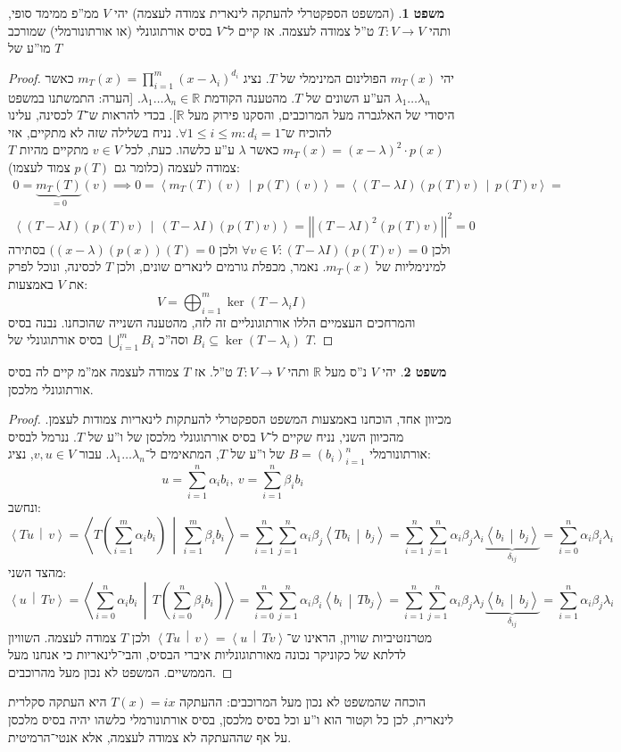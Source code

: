 \documentclass[a4paper]{article}
\newcommand\R     {\mathbb{R}}
\newcommand\ra    {\rangle}
\newcommand\la    {\langle}
\newcommand\sumni     {\sum_{i = 0}^{n}}
\newcommand\co        {\colon}
\newcommand\norm[1]   {\left \vert \left \vert #1 \right \vert \right \vert}
\newcommand\mut [2]   {\left \la #1 \,\middle\vert\, #2 \right \ra}
\newcommand\ag        {\alpha}
\newcommand\bg        {\beta}
\newcommand\dg        {\delta}
\renewcommand\lg      {\lambda}
\newcommand\cl [1]    {\left ( #1 \right )}
\theoremstyle{definition}
\newtheorem{Theorem}{משפט}
\newcommand\theo  [1] {\begin{Theorem}#1\end{Theorem}}
\begin{document}
	\theo{(המשפט הספקטרלי להעתקה לינארית צמודה לעצמה) יהי $V$ ממ''פ ממימד סופי, ותהי $T \co V \to V$ ט''ל צמודה לעצמה. אז קיים ל־$V$ בסיס אורתוגונלי (או אורתונורמלי) שמורכב מו''ע של $T$} \begin{proof}
		יהי $m_T(x)$ הפולינום המינימלי של $T$. נציג $m_T(x) = \prod_{i = 1}^{m}(x - \lg_i)^{d_i}$ כאשר $\lg_1 \dots \lg_n$ הע''ע השונים של $T$. מהטענה הקודמת $\lg_1 \dots \lg_n \in \R$. [הערה: התמשתנו במשפט היסודי של האלגברה מעל המרוכבים, והסקנו פירוק מעל $\R$]. בכדי להראות ש־$T$ לכסינה, עלינו להוכיח ש־$\forall 1 \le i \le m \co d_i = 1$. נניח בשלילה שזה לא מתקיים, אזי $m_T(x) = (x - \lg)^2 \cdot p(x)$ כאשר $\lg$ ע''ע כלשהו. כעת, לכל $v \in V$ מתקיים מהיות $T$ צמודה לעצמה (כלומר גם $p(T)$ צמוד לעצמו): 
		\begin{multline*}
			0 = \underbrace{m_T(T)}_{=0}(v) \implies 0 = \mut{m_T(T)(v)}{p(T)(v)} = \mut{(T - \lg I)(p(T)v)}{p(T)v} =\\ \mut{(T - \lg I)(p(T)v)}{(T - \lg I)(p(T)v)} = \norm{(T - \lg I)^2(p(T)v)}^2 = 0
		\end{multline*}
		ולכן $\forall v \in V \co (T - \lg I)(p(T)v) = 0$ ולכן $((x - \lg)(p(x))(T) = 0$ בסתירה למינימליות של $m_T(x)$. נאמר, מכפלת גורמים לינארים שונים, ולכן $T$ לכסינה, ונוכל לפרק את $V$ באמצעות: 
		\[ V = \bigoplus_{i = 1}^{m} \ker (T - \lg_i I) \]
		והמרחכים העצמיים הללו אורתוגונליים זה לזה, מהטענה השנייה שהוכחנו. 
		נבנה בסיס $B_i \subseteq \ker (T - \lg_i)$ וסה''כ $\bigcup_{i = 1}^{m} B_i$ בסיס אורתוגונלי של $T$. 
	\end{proof}
	\theo{יהי $V$ נ''ס מעל $\R$ ותהי $T \co V \to V$ ט''ל. אז $T$ צמודה לעצמה אמ''מ קיים לה בסיס אורתוגונלי מלכסן. }\begin{proof}
		מכיוון אחד, הוכחנו באמצעות המשפט הספקטרלי להעתקות לינאריות צמודות לעצמן. 
		מהכיוון השני, נניח שקיים ל־$V$ בסיס אורתוגונלי מלכסן של ו''ע של $T$. ננרמל לבסיס אורתונורמלי $B = (b_i)_{i = 1}^{n}$ של ו''ע של $T$, המתאימים ל־$\lg_1 \dots \lg_n$. עבור $v, u \in V$, נציג: 
		\[ u = \sum_{i = 1}^{n}\ag_i b_i, \ v = \sum_{i = 1}^{n}\bg_i b_i \]
		ונחשב: 
		\[ \mut{Tu}{v} = \mut{T\cl{\sum_{i = 1}^{m}\ag_i b_i}}{\sum_{i = 1}^{m}\bg_i b_i} = \sum_{i = 1}^{n}\sum_{j = 1}^{n}\ag_i \bg_j \mut{T b_i}{b_j} = \sum_{i = 1}^{n}\sum_{j = 1}^{n}\ag_i \bg_j \lg_i \underbrace{\mut{b_i}{b_j}}_{\dg_{ij}} = \sumni \ag_i \bg_i \lg_i \]
		מהצד השני: 
		\[ \mut{u}{Tv} = \mut{\sumni \ag_i b_i}{T\cl{\sumni \bg_i b_i}} = \sumni \sum_{j = 1}^{n}\ag_i \bg_i \mut{b_i}{Tb_j} = \sum_{i = 1}^{n}\sum_{j = 1}^{n}\ag_i \bg_j \lg_j \underbrace{\mut{b_i}{b_j}}_{\dg_{ij}} = \sum_{i = 1}^{n}\ag_i \bg_j \lg_i \]
		מטרנזטיביות שוויון, הראינו ש־$\mut{Tu}{v} = \mut{u}{Tv}$ ולכן $T$ צמודה לעצמה. השוויון לדלתא של כקוניקר נכונה מאורתוגונליות איברי הבסיס, והבי־לינאריות כי אנחנו מעל הממשיים. המשפט לא נכון מעל מהרוכבים. 
	\end{proof}
	הוכחה שהמשפט לא נכון מעל המרוכבים: ההעתקה $T(x) = ix$ היא העתקה סקלרית לינארית, לכן כל וקטור הוא ו''ע וכל בסיס מלכסן, בסיס אורתונורמלי כלשהו יהיה בסיס מלכסן על אף שההעתקה לא צמודה לעצמה, אלא אנטי־הרמיטית. 
	
\end{document}
